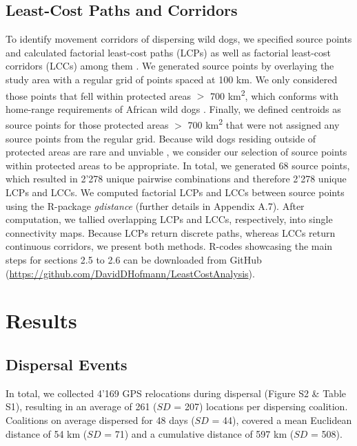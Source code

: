 \documentclass[abstract=on,10pt,a4paper,bibliography=totocnumbered]{article}
\begin{document}
\subsection{Least-Cost Paths and Corridors}
To identify movement corridors of dispersing wild dogs, we specified source
points and calculated factorial least-cost paths (LCPs) as well as factorial
least-cost corridors (LCCs) among them \citep{Elliot.2014}. We generated source
points by overlaying the study area with a regular grid of points spaced at 100
km. We only considered those points that fell within protected areas \(>\) 700
km\textsuperscript{2}, which conforms with home-range requirements of African
wild dogs \citep{Pomilia.2015}. Finally, we defined centroids as source points
for those protected areas \(>\) 700 km\textsuperscript{2} that were not assigned
any source points from the regular grid. Because wild dogs residing outside of
protected areas are rare and unviable \citep{VanDerMeer.2014}, we consider our
selection of source points within protected areas to be appropriate. In total,
we generated 68 source points, which resulted in 2'278 unique pairwise
combinations and therefore 2'278 unique LCPs and LCCs. We computed factorial
LCPs and LCCs between source points using the R-package \textit{gdistance}
(further details in Appendix A.7). After computation, we tallied overlapping
LCPs and LCCs, respectively, into single connectivity maps. Because LCPs return
discrete paths, whereas LCCs return continuous corridors, we present both
methods. R-codes showcasing the main steps for sections 2.5 to 2.6 can be
downloaded from GitHub
(\url{https://github.com/DavidDHofmann/LeastCostAnalysis}).

\section{Results}
\subsection{Dispersal Events}
In total, we collected 4'169 GPS relocations during dispersal (Figure S2 \&
Table S1), resulting in an average of 261 (\(SD\) = 207) locations per
dispersing coalition. Coalitions on average dispersed for 48 days (\(SD\) = 44),
covered a mean Euclidean distance of 54 km (\(SD\) = 71) and a cumulative
distance of 597 km (\(SD\) = 508).
\end{document}
